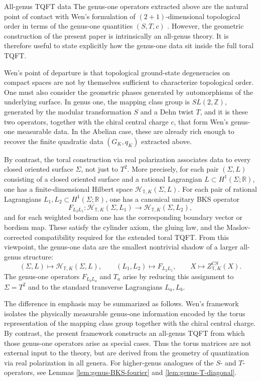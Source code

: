 \documentclass[12pt]{amsart}
\makeatletter
\renewcommand\subsection{\@startsection{subsection}{2}%
  \z@{.5\linespacing\@plus.7\linespacing}{-.5em}%
  {\normalfont\bfseries}}
\numberwithin{equation}{section}
\makeatother
\begin{document}
\subsection{All-genus TQFT data}
The genus-one operators extracted above are the natural point of contact with Wen's
formulation of \((2+1)\)-dimensional topological order in terms of the genus-one quantities
\((S,T,c)\) \cite{Wen2016}. However, the geometric
construction of the present paper is intrinsically an all-genus theory. It is therefore useful
to state explicitly how the genus-one data sit inside the full toral TQFT.

Wen's point of departure is that topological ground-state degeneracies on compact spaces
are not by themselves sufficient to characterize topological order. One must also consider
the geometric phases generated by automorphisms of the underlying surface. In genus one,
the mapping class group is \(SL(2,\mathbb Z)\), generated by the modular transformation
\(S\) and a Dehn twist \(T\), and it is these two operators, together with the chiral central
charge \(c\), that form Wen's genus-one measurable data. In the Abelian case, these are
already rich enough to recover the finite quadratic data \((G_K,q_K)\) extracted above.

By contrast, the toral construction via real polarization associates data to every closed oriented
surface \(\Sigma\), not just to \(T^2\). More precisely, for each pair \((\Sigma,L)\) consisting of
a closed oriented surface and a rational Lagrangian
\(L\subset H^1(\Sigma;\mathbb R)\), one has a finite-dimensional Hilbert space $\mathcal{H}_{\mathbb T,K}(\Sigma,L).$ For each pair of rational Lagrangians \(L_1,L_2\subset H^1(\Sigma;\mathbb R)\), one has a
canonical unitary BKS operator
\[
F_{L_2L_1}:\mathcal{H}_{\mathbb T,K}(\Sigma,L_1)\to \mathcal{H}_{\mathbb T,K}(\Sigma,L_2),
\]
and for each weighted bordism one has the corresponding boundary vector or bordism map.
These satisfy the cylinder axiom, the gluing law, and the Maslov-corrected compatibility
required for the extended toral TQFT. From this viewpoint, the genus-one data are the smallest nontrivial shadow of a larger
all-genus structure:
\[
(\Sigma,L)\longmapsto \mathcal{H}_{\mathbb T,K}(\Sigma,L),
\qquad
(L_1,L_2)\longmapsto F_{L_2L_1},
\qquad
X\longmapsto Z^{CS}_{\mathbb T,K}(X).
\]
The genus-one operators \(F_{L_bL_a}\) and \(T_a\) arise by reducing this assignment to
\(\Sigma=T^2\) and to the standard transverse Lagrangians \(L_a,L_b\).

The difference in emphasis may be summarized as follows. Wen’s framework isolates the physically measurable genus-one information encoded by the torus representation of the mapping class group together with the chiral central charge. By contrast, the present framework constructs an all-genus TQFT from which those genus-one operators arise as special cases. Thus the torus matrices are not external input to the theory, but are derived from the geometry of quantization via real polarization in all genera. For higher-genus analogues of the  $S$- and $T$-operators, see Lemmas \ref{lem:genus-BKS-fourier} and \ref{lem:genus-T-diagonal}.
\end{document}
